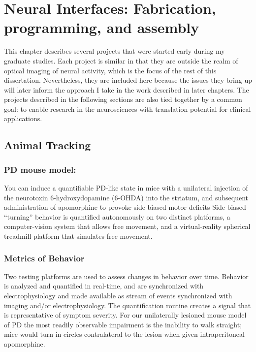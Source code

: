 % 

\thispagestyle{myheadings}

\chapter{Neural Interfaces: Fabrication, programming, and assembly}
\label{sec:neural-interfaces}

This chapter describes several projects that were started early during my graduate studies.
Each project is similar in that they are outside the realm of optical imaging of neural activity, which is the focus of the rest of this dissertation.
Nevertheless, they are included here because the issues they bring up will later inform the approach I take in the work described in later chapters.
The projects described in the following sections are also tied together by a common goal: to enable research in the neurosciences with translation potential for clinical applications.

\section{Animal Tracking}\label{sec:animal-tracking}

\subsection{PD mouse model:}\label{sec:pd-mouse-model}

You can induce a quantifiable PD-like state in mice with a unilateral injection of the neurotoxin 6-hydroxydopamine (6-OHDA) into the striatum, and subsequent administration of apomorphine to provoke side-biased motor deficits \cite{iancu_behavioral_2005}
Side-biased ``turning'' behavior is quantified autonomously on two distinct platforms, a computer-vision system that allows free movement, and a virtual-reality spherical treadmill platform that simulates free movement.

\subsection{Metrics of Behavior}\label{sec:metrics-of-behavior}

Two testing platforms are used to assess changes in behavior over time.
Behavior is analyzed and quantified in real-time, and are synchronized with electrophysiology and made available as stream of events synchronized with imaging and/or electrophysiology.
The quantification routine creates a signal that is representative of symptom severity.
For our unilaterally lesioned mouse model of PD the most readily observable impairment is the inability to walk straight;
mice would turn in circles
contralateral to the lesion when given intraperitoneal apomorphine.

